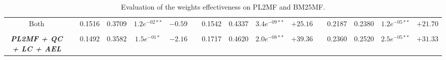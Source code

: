 \begin{table*}
{\begin{tabular}{cc@{\hs}rrccc@{\hs}rrccc@{\hs}rrcc}
                          \\
{\raggedright Both} & \phantom{a} & 0.1516 & 0.3709 & $1.2e^{-02**}$ & $-0.59$
                    & \phantom{a} & 0.1542 & 0.4337 & $3.4e^{-09**}$ & $+25.16$
                    & \phantom{a} & 0.2187 & 0.2380 & $1.2e^{-05**}$ & $+21.70$
        \\
\\
\emph{\textbf{PL2MF + QC + LC + AEL}} & \phantom{a} & 0.1492 & 0.3582 & $1.5e^{-01*}$ & $-2.16$
                                      & \phantom{a} & 0.1717 & 0.4620 & $2.0e^{-08**}$ & $+39.36$
                                      & \phantom{a} & 0.2360 & 0.2520 & $2.5e^{-05**}$ & $+31.33$ \\
\bottomrule
\end{tabular}}
\caption{Evaluation of the weights effectiveness on PL2MF and BM25MF.%
}
\label{tab:mf-effect}
\end{table*}
